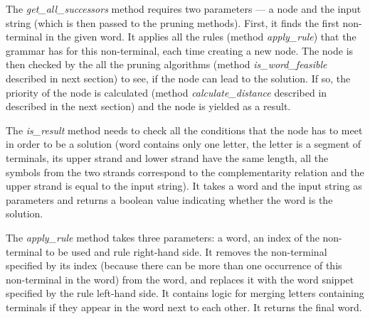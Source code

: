 The \textit{get\_all\_successors} method requires two parameters --- a node and the input string (which is then passed to the pruning methods). First, it finds the first non-terminal in the given word. It applies all the rules (method \textit{apply\_rule}) that the grammar has for this non-terminal, each time creating a new node. The node is then checked by the all the pruning algorithms (method \textit{is\_word\_feasible} described in next section) to see, if the node can lead to the solution. If so, the priority of the node is calculated (method \textit{calculate\_distance} described in described in the next section) and the node is yielded as a result.

The \textit{is\_result} method needs to check all the conditions that the node has to meet in order to be a solution (word contains only one letter, the letter is a segment of terminals, its upper strand and lower strand have the same length, all the symbols from the two strands correspond to the complementarity relation and the upper strand is equal to the input string). It takes a word and the input string as parameters and returns a boolean value indicating whether the word is the solution.

The \textit{apply\_rule} method takes three parameters: a word, an index of the non-terminal to be used and rule right-hand side. It removes the non-terminal specified by its index (because there can be more than one occurrence of this non-terminal in the word) from the word, and replaces it with the word snippet specified by the rule left-hand side. It contains logic for merging letters containing terminals if they appear in the word next to each other. It returns the final word.

